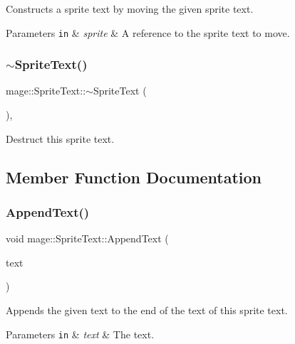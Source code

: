 Constructs a sprite text by moving the given sprite text.


\begin{DoxyParams}[1]{Parameters}
\mbox{\tt in}  & {\em sprite} & A reference to the sprite text to move. \\
\hline
\end{DoxyParams}
\hypertarget{classmage_1_1_sprite_text_aa30d68a79775dce902c190f2cd298bb4}{}\label{classmage_1_1_sprite_text_aa30d68a79775dce902c190f2cd298bb4} 
\subsubsection{\texorpdfstring{$\sim$\+Sprite\+Text()}{~SpriteText()}}
{\footnotesize\ttfamily mage\+::\+Sprite\+Text\+::$\sim$\+Sprite\+Text (\begin{DoxyParamCaption}{ }\end{DoxyParamCaption})\hspace{0.3cm}{\ttfamily [virtual]}, {\ttfamily [default]}}

Destruct this sprite text. 

\subsection{Member Function Documentation}
\hypertarget{classmage_1_1_sprite_text_ae401ba9ddbb1e53e84fb24f4bd4f11bb}{}\label{classmage_1_1_sprite_text_ae401ba9ddbb1e53e84fb24f4bd4f11bb} 
\subsubsection{\texorpdfstring{Append\+Text()}{AppendText()}}
{\footnotesize\ttfamily void mage\+::\+Sprite\+Text\+::\+Append\+Text (\begin{DoxyParamCaption}\item[{\hyperlink{classmage_1_1_color_string}{Color\+String}}]{text }\end{DoxyParamCaption})}

Appends the given text to the end of the text of this sprite text.


\begin{DoxyParams}[1]{Parameters}
\mbox{\tt in}  & {\em text} & The text. \\
\hline
\end{DoxyParams}
\hypertarget{classmage_1_1_sprite_text_add6f3e1150dc041d999dba772e43be14}{}\label{classmage_1_1_sprite_text_add6f3e1150dc041d999dba772e43be14} 
